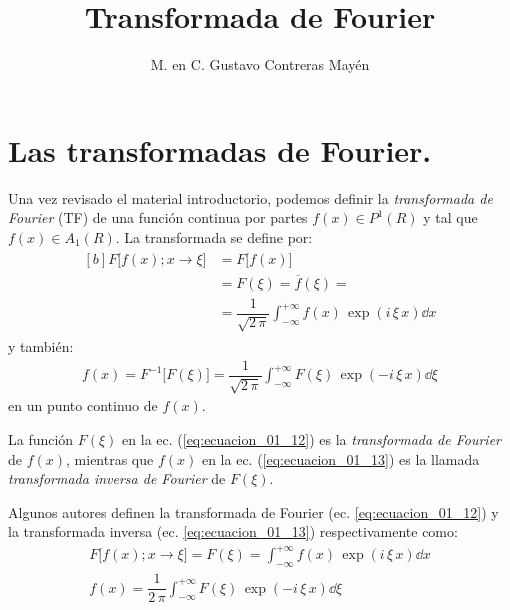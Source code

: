 
\title{Transformada de Fourier} \vspace{-3ex}
\author{M. en C. Gustavo Contreras Mayén}
\date{ }
\newcommand{\Cancel}[2][black]{{\color{#1}\cancel{\color{black}#2}}}

\vspace{-4cm}
\maketitle
\fontsize{14}{14}\selectfont
\tableofcontents
\newpage

\section{Las transformadas de Fourier.}

Una vez revisado el material introductorio, podemos definir la \emph{transformada de Fourier} (TF) de una función continua por partes $f(x) \in P^{1} (R)$ y tal que $f(x) \in A_{1} (R)$. La transformada se define por:
\begin{align}
\begin{aligned}[b]
F \big[ f(x); x \to \xi \big] &= F \big[f(x) \big] \\[0.5em]
&= F(\xi) = \overline{f} (\xi) = \\[0.5em] 
&= \dfrac{1}{\sqrt{2 \, \pi}} \int_{-\infty}^{+\infty} f(x) \, \exp(i \, \xi \, x) \dd{x}
\end{aligned}
\label{eq:ecuacion_01_12}
\end{align}
y también:
\begin{align}
f(x) = F^{-1} \big[ F(\xi) \big] = \dfrac{1}{\sqrt{2 \, \pi}} \int_{-\infty}^{+\infty} F(\xi) \, \exp(-i \, \xi \, x) \dd{\xi}
\label{eq:ecuacion_01_13}
\end{align}
en un punto continuo de $f(x)$.
\par
La función $F(\xi)$ en la ec. (\ref{eq:ecuacion_01_12}) es la \emph{transformada de Fourier} de $f(x)$, mientras que $f(x)$ en la ec. (\ref{eq:ecuacion_01_13}) es la llamada \emph{transformada inversa de Fourier} de $F(\xi)$.
\par
Algunos autores definen la transformada de Fourier  (ec. \ref{eq:ecuacion_01_12}) y la transformada inversa (ec. \ref{eq:ecuacion_01_13}) respectivamente como:
\begin{align}
F \big[ f(x); x \to \xi \big] = F(\xi) = \int_{-\infty}^{+\infty} f(x) \, \exp(i \, \xi \, x) \dd{x} \label{eq:ecuacion_01_14} \\[0.5em]
f(x) = \dfrac{1}{2 \, \pi} \int_{-\infty}^{+\infty} F(\xi) \, \exp(-i \, \xi \, x) \dd{\xi}
\label{eq:ecuacion_01_15}
\end{align}

